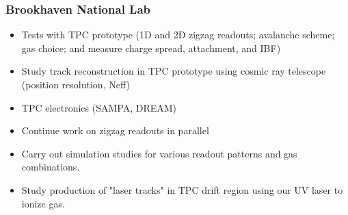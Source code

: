 \subsubsection{Brookhaven National Lab} 

\begin{itemize}
\item Tests with TPC prototype (1D and 2D zigzag readouts; avalanche scheme; gas choice; and measure charge spread, attachment, and IBF) 
\item Study track reconstruction in TPC prototype using cosmic ray telescope (position resolution, Neff) 
\item TPC electronics (SAMPA, DREAM)
\item Continue work on zigzag readouts in parallel 
\item Carry out simulation studies for various readout patterns and gas combinations. 
\item Study production of "laser tracks" in TPC drift region using our UV laser to ionize gas.

\end{itemize}

